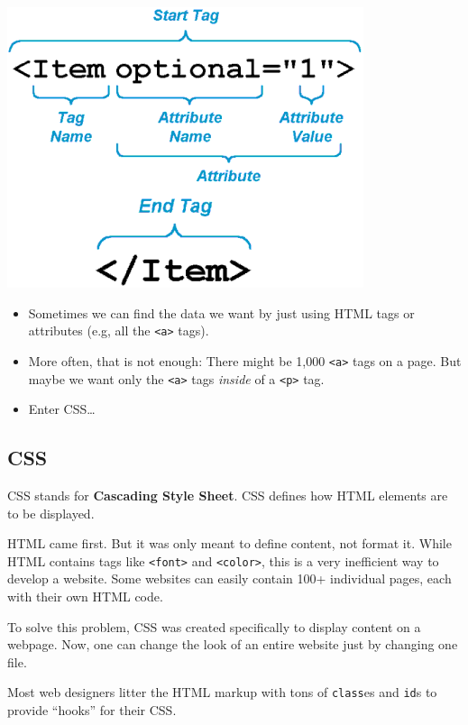 \documentclass[]{book}
\providecommand{\tightlist}{%
  \setlength{\itemsep}{0pt}\setlength{\parskip}{0pt}}
\begin{document}
\begin{center}\includegraphics[width=0.7\linewidth]{img/html-attributes} \end{center}

\begin{itemize}
\tightlist
\item
  Sometimes we can find the data we want by just using HTML tags or
  attributes (e.g, all the \texttt{\textless{}a\textgreater{}} tags).
\item
  More often, that is not enough: There might be 1,000
  \texttt{\textless{}a\textgreater{}} tags on a page. But maybe we want
  only the \texttt{\textless{}a\textgreater{}} tags \emph{inside} of a
  \texttt{\textless{}p\textgreater{}} tag.
\item
  Enter CSS\ldots{}
\end{itemize}

\subsection{CSS}\label{css}

CSS stands for \textbf{Cascading Style Sheet}. CSS defines how HTML
elements are to be displayed.

HTML came first. But it was only meant to define content, not format it.
While HTML contains tags like \texttt{\textless{}font\textgreater{}} and
\texttt{\textless{}color\textgreater{}}, this is a very inefficient way
to develop a website. Some websites can easily contain 100+ individual
pages, each with their own HTML code.

To solve this problem, CSS was created specifically to display content
on a webpage. Now, one can change the look of an entire website just by
changing one file.

Most web designers litter the HTML markup with tons of \texttt{class}es
and \texttt{id}s to provide ``hooks'' for their CSS.
\end{document}
